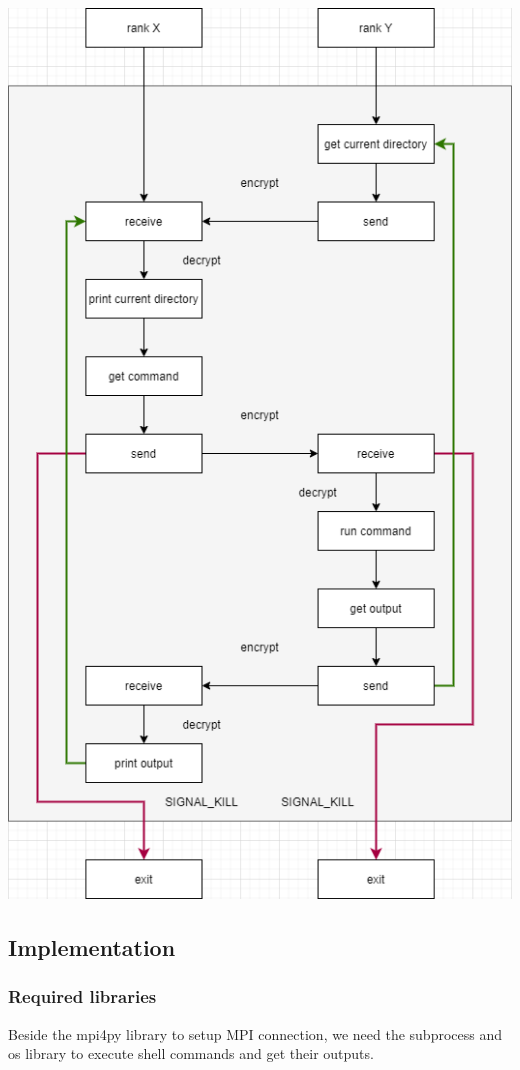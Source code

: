 \begin{center}
    \includegraphics[scale=0.6]{images/client_server_protocol.png}
\end{center}

\subsection{Implementation}

\subsubsection{Required libraries}
Beside the mpi4py library to setup MPI connection, we need the subprocess and os library to execute shell commands and get their outputs.

